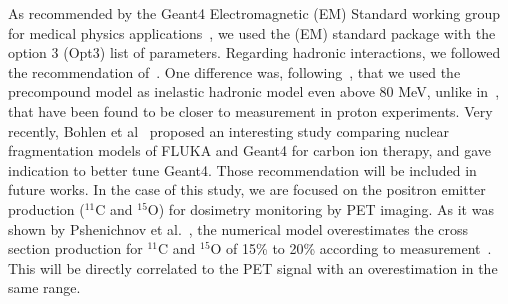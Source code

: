 \documentclass[11pt]{iopart}
\newcommand{\dsnote}[1]{{\color{green}[#1]}}
\newcommand{\sjnote}[1]{{\color{red}[#1]}}
\begin{document}
As recommended by the Geant4 Electromagnetic (EM) Standard working
group for medical physics applications~\cite{G4EMGroup2010}, we used
the (EM) standard package with the option 3 (Opt3) list of
parameters. Regarding hadronic interactions, we followed the
recommendation of~\cite{Pshenichnov2007, Zacharatou2008}. One
difference was, following~\cite{Polf2009, Peterson2009,
  Grevillot2010}, that we used the precompound model as inelastic
hadronic model even above 80 MeV, unlike in~\cite{Pshenichnov2007},
that have been found to be closer to measurement in proton
experiments. Very recently, Bohlen et al~\cite{Bohlen2010} proposed an
interesting study comparing nuclear fragmentation models of FLUKA and
Geant4 for carbon ion therapy, and gave indication to better tune
Geant4. Those recommendation will be included in future works.  In the
case of this study, we are focused on the positron emitter production
($^{11}$C and $^{15}$O) for dosimetry monitoring by PET imaging. As it
was shown by Pshenichnov et al.~\cite{Pshenichnov2006}, the numerical
model overestimates the cross section production for $^{11}$C and
$^{15}$O of 15\% to 20\% according to
measurement~\cite{Parodi2007a}. This will be directly correlated to
the PET signal with an overestimation in the same range.



\end{document}
